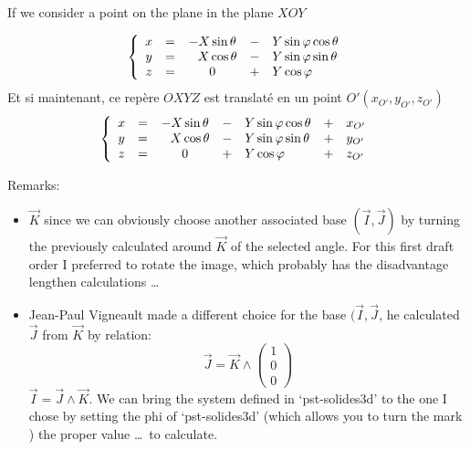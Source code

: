 If we consider a point on the plane in the plane $XOY$

\[
\left\lbrace\begin{array}{ccccl}
x&=&-X\sin\theta&-&Y\sin\varphi\cos\theta\\
y&=&\hphantom{-}X\cos\theta&-&Y\sin\varphi\sin\theta\\
z&=&0&+&Y\cos\varphi
\end{array}
\right.
\]
Et si maintenant, ce repère $OXYZ$ est translaté en un point
$O'(x_{O'},y_{O'},z_{O'})$
\[
\left\lbrace\begin{array}{cccclcl}
x&=&-X\sin\theta&-&Y\sin\varphi\cos\theta&+&x_{O'}\\
y&=&\hphantom{-}X\cos\theta&-&Y\sin\varphi\sin\theta&+&y_{O'}\\
z&=&0&+&Y\cos\varphi&+&z_{O'}
\end{array}
\right.
\]

Remarks:
\begin{itemize}
\item  $\overrightarrow{K}$ since we can obviously choose another associated base $ (\overrightarrow {I}, 
\overrightarrow {J}) $ by turning the previously calculated around $ \overrightarrow {K} $ of the selected angle. 
For this first draft order I preferred to rotate the image, which probably has the disadvantage lengthen calculations \ldots\

\item Jean-Paul Vigneault made a different choice for the base $(\overrightarrow{I}, \overrightarrow{J} $, 
he calculated $ \overrightarrow {J}$ from $\overrightarrow {K} $ by relation:
\[
\overrightarrow{J}=\overrightarrow{K}\wedge \left(%
 \begin{array}{c}
 1\\
 0\\
 0
 \end{array}
 \right)
\]
 $\overrightarrow{I}=\overrightarrow{J}\wedge\overrightarrow{K}$.
We can bring the system defined in `\textsf{pst-solides3d}' to the one I chose by setting the \textsf{phi} 
of `\textsf{pst-solides3d}' (which allows you to turn the mark ) the proper value \ldots\ to calculate.

\end{itemize}

